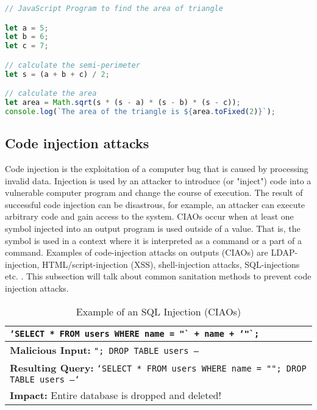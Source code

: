 \begin{lstlisting}[language=JavaScript, caption=Example of a transpiled code]
// JavaScript Program to find the area of triangle

let a = 5;
let b = 6;
let c = 7;

// calculate the semi-perimeter
let s = (a + b + c) / 2;

// calculate the area
let area = Math.sqrt(s * (s - a) * (s - b) * (s - c));
console.log(`The area of the triangle is ${area.toFixed(2)}`);
\end{lstlisting}

\subsection{Code injection attacks}  \label{section:code_injection}
Code injection is the exploitation of a computer bug that is caused by processing invalid data. Injection is used by an attacker to introduce (or "inject") code into a vulnerable computer program and change the course of execution. The result of successful code injection can be disastrous, for example, an attacker can execute arbitrary code and gain access to the system. CIAOs occur when at least one symbol injected into an output program is used outside of a value. That is, the symbol is used in a context where it is interpreted as a command or a part of a command. Examples of code-injection attacks on outputs (CIAOs) are LDAP-injection, HTML/script-injection (XSS), shell-injection attacks, SQL-injections etc. \cite{ray2012defining}. This subsection will talk about common sanitation methods to prevent code injection attacks.

\begin{table}[H]
    \label{table:sql_injection}
    \centering
    \caption{Example of an SQL Injection (CIAOs)}
    \begin{tabular}{|l|}
        \hline
        \texttt{`SELECT * FROM users WHERE name = "` + name + `"`;} \\
        \hline
        \textbf{Malicious Input:} \texttt{"; DROP TABLE users --} \\
        \hline
        \textbf{Resulting Query:} \texttt{`SELECT * FROM users WHERE name = ""; DROP TABLE users --`} \\
        \hline
        \textbf{Impact:} Entire database is dropped and deleted! \\
        \hline
    \end{tabular}
\end{table}

